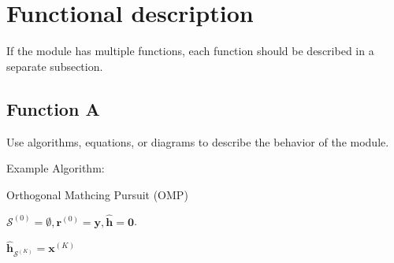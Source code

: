 \documentclass[a4paper, oneside]{report}
\begin{document}
        \section{Functional description}
            If the module has multiple functions, each function should be described in a separate subsection.
            \subsection{Function A}
                Use algorithms, equations, or diagrams to describe the behavior of the module.
                
                Example Algorithm:

                {
                    \RemoveAlgoNumber
                    \begin{algorithm}[H]
                        \caption{Orthogonal Mathcing Pursuit (OMP)}
                        \vspace{1pt}
                        \vspace{1pt}
                        $\mathcal{S}^{(0)} = \emptyset, \mathbf{r}^{(0)} = \mathbf{y}, \hat{\mathbf{h}} = \mathbf{0}$. 
                    
                    
                        $\hat{\mathbf{h}}_{\mathcal{S}^{(K)}} = \mathbf{x}^{(K)}$ \label{alg:OMP:step:output} 
                    \end{algorithm}
                }
\end{document}
